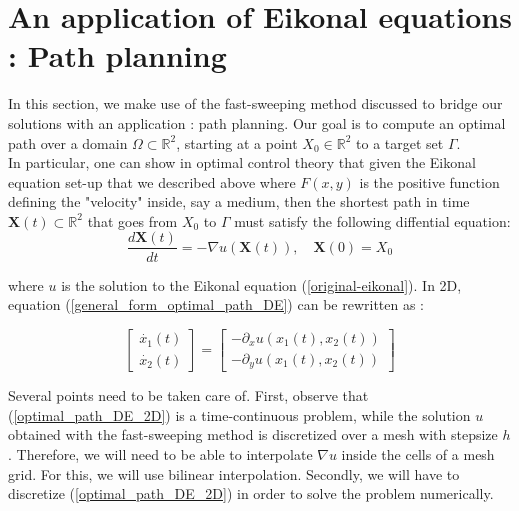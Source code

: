 \documentclass[11pt]{article}
\theoremstyle{definition}
\theoremstyle{remark}
\newcommand{\R}{\mathbb{R}}
\begin{document}
\vspace{10pt}



\newpage

\section{An application of Eikonal equations : Path planning}
\label{path_planning}
In this section, we make use of the fast-sweeping method discussed to bridge our solutions with an application : path planning. Our goal is to compute an optimal path over a domain $\Omega\subset\R^2$, starting at a point $X_0\in \R^2$ to a target set $\Gamma$. \\
In particular, one can show in optimal control theory that given the Eikonal equation set-up that we described above where $F(x,y)$ is the positive function defining the "velocity" inside, say a medium, then the shortest path in time $\textbf{X}(t)\subset \R^2$ that goes from $X_0$ to $\Gamma$ must satisfy the following diffential equation:
\begin{equation}
\label{general_form_optimal_path_DE}
    \frac{d\textbf{X}(t)}{dt}=-\nabla u(\textbf{X}(t)), \quad \textbf{X}(0)=X_0
\end{equation}

\noindent where $u$ is the solution to the Eikonal equation (\ref{original-eikonal}). In 2D, equation (\ref{general_form_optimal_path_DE}) can be rewritten as : 

\begin{equation}
\label{optimal_path_DE_2D}
    \begin{bmatrix}
        \dot{x_1}(t) \\
        \dot{x_2}(t)
    \end{bmatrix} = \begin{bmatrix}
        -\partial_xu(x_1(t),x_2(t)) \\
        -\partial_yu(x_1(t),x_2(t))
    \end{bmatrix}
\end{equation}

\noindent Several points need to be taken care of. First, observe that (\ref{optimal_path_DE_2D}) is a time-continuous problem, while the solution $u$ obtained with the fast-sweeping method is discretized over a mesh with stepsize $h$. Therefore, we will need to be able to interpolate $\nabla u$ inside the cells of a mesh grid. For this, we will use bilinear interpolation. Secondly, we will have to discretize (\ref{optimal_path_DE_2D}) in order to solve the problem numerically.
\end{document}

